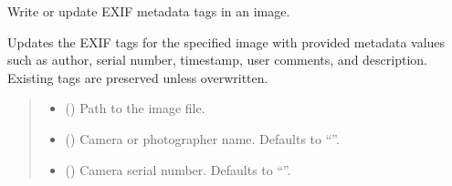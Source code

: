 \documentclass[letterpaper,10pt,english]{sphinxmanual}
\begin{document}
\begin{fulllineitems}
\label{\detokenize{modules/src.data_intake.data_intake.utils:src.data_intake.data_intake.utils.writeExifTag}}
\pysigstartsignatures
\pysiglinewithargsret
{}
{\sphinxparamcomma {}\sphinxparamcomma {}\sphinxparamcomma {}\sphinxparamcomma {}\sphinxparamcomma {}}
{}
\pysigstopsignatures
\sphinxAtStartPar
Write or update EXIF metadata tags in an image.

\sphinxAtStartPar
Updates the EXIF tags for the specified image with provided metadata
values such as author, serial number, timestamp, user comments, and
description. Existing tags are preserved unless overwritten.
\begin{quote}\begin{description}
\begin{itemize}
\item {} 
\sphinxAtStartPar
{} () \textendash{} Path to the image file.

\item {} 
\sphinxAtStartPar
{} (\sphinxstyleliteralemphasis{\sphinxupquote{, }}) \textendash{} Camera or photographer name. Defaults to “”.

\item {} 
\sphinxAtStartPar
{} (\sphinxstyleliteralemphasis{\sphinxupquote{, }}) \textendash{} Camera serial number. Defaults to “”.


\end{itemize}
\end{description}
\end{quote}
\end{fulllineitems}
\end{document}
